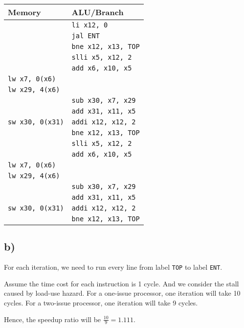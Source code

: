\documentclass[a4paper,12pt]{article}
\begin{document}
\begin{center}
	\begin{tabular}{|l|l|}
		\hline
		Memory & ALU/Branch \\ \hline
		& \texttt{li x12, 0} \\ \hline
		& \texttt{jal ENT} \\ \hline
		& \texttt{bne x12, x13, TOP} \\ \hline
		& \texttt{slli x5, x12, 2} \\ \hline
		& \texttt{add x6, x10, x5} \\ \hline
		\texttt{lw x7, 0(x6)} & \\ \hline
		\texttt{lw x29, 4(x6)} & \\ \hline
		& \texttt{sub x30, x7, x29} \\ \hline
		& \texttt{add x31, x11, x5} \\ \hline
		\texttt{sw x30, 0(x31)} & \texttt{addi x12, x12, 2} \\ \hline
		& \texttt{bne x12, x13, TOP} \\ \hline
		& \texttt{slli x5, x12, 2} \\ \hline
		& \texttt{add x6, x10, x5} \\ \hline
		\texttt{lw x7, 0(x6)} & \\ \hline
		\texttt{lw x29, 4(x6)} & \\ \hline
		& \texttt{sub x30, x7, x29} \\ \hline
		& \texttt{add x31, x11, x5} \\ \hline
		\texttt{sw x30, 0(x31)} & \texttt{addi x12, x12, 2} \\ \hline
		& \texttt{bne x12, x13, TOP} \\ \hline
	\end{tabular}
\end{center}

\subsection*{b)}

For each iteration, we need to run every line from label \texttt{TOP} to label \texttt{ENT}.

Assume the time cost for each instruction is 1 cycle.
And we consider the stall caused by load-use hazard.
For a one-issue processor, one iteration will take 10 cycles.
For a two-issue processor, one iteration will take 9 cycles.

Hence, the speedup ratio will be $\frac{10}{9} = 1.111$.
\end{document}
